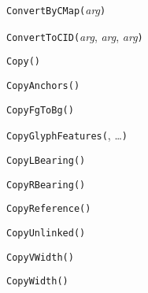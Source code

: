 

\texttt{ConvertByCMap(}\textit{arg}\texttt{)}



\texttt{ConvertToCID(}\textit{arg}, \textit{arg}, \textit{arg}\texttt{)}



\texttt{Copy(}\texttt{)}



\texttt{CopyAnchors(}\texttt{)}



\texttt{CopyFgToBg(}\texttt{)}



\texttt{CopyGlyphFeatures(}, \ldots\texttt{)}



\texttt{CopyLBearing(}\texttt{)}



\texttt{CopyRBearing(}\texttt{)}



\texttt{CopyReference(}\texttt{)}



\texttt{CopyUnlinked(}\texttt{)}



\texttt{CopyVWidth(}\texttt{)}



\texttt{CopyWidth(}\texttt{)}

